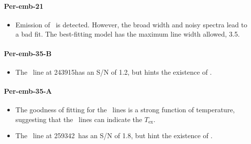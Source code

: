 
\paragraph{Per-emb-21}
\begin{itemize}
  \item Emission of \methanol\ is detected.  However, the broad width and noisy spectra lead to a bad fit.  The best-fitting model has the maximum line width allowed, 3.5\kms.
\end{itemize}


\paragraph{Per-emb-35-B}
\begin{itemize}
  \item The \methanol\ line at 243915\mhz has an S/N of 1.2, but hints the existence of \methanol.
\end{itemize}

\paragraph{Per-emb-35-A}
\begin{itemize}
  \item The goodness of fitting for the \methanol\ lines is a strong function of temperature, suggesting that the \methanol\ lines can indicate the $T_\text{ex}$.
  \item The \methylformate\ line at 259342\mhz\ has an S/N of 1.8, but hint the existence of \methylformate.
\end{itemize}

